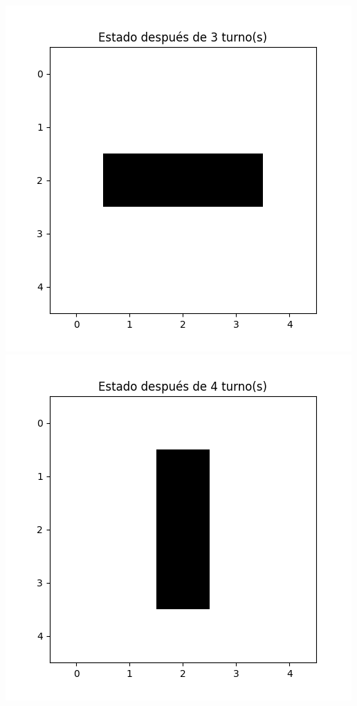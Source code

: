 \begin{itemize}
\begin{center}
        \includegraphics[scale=0.4]{IMA/ejemplosJuegoVida/ejemplo 2.4.png}
        \includegraphics[scale=0.4]{IMA/ejemplosJuegoVida/ejemplo 2.5.png}

\end{center}
\end{itemize}

